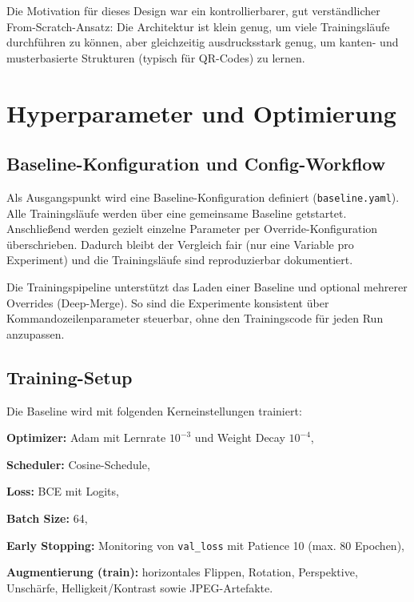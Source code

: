 Die Motivation für dieses Design war ein kontrollierbarer, gut verständlicher \glqq From-Scratch\grqq{}-Ansatz: Die Architektur ist klein genug, um viele Trainingsläufe durchführen zu können, aber gleichzeitig ausdrucksstark genug, um kanten- und musterbasierte Strukturen (typisch für \ac{QR}-Codes) zu lernen.

\section{Hyperparameter und Optimierung}
\label{sec:cnn_hyperparameter}

\subsection{Baseline-Konfiguration und Config-Workflow}
\label{subsec:cnn_baseline_config}

Als Ausgangspunkt wird eine Baseline-Konfiguration definiert (\texttt{baseline.yaml}). Alle Trainingsläufe werden über eine gemeinsame Baseline getstartet. Anschließend werden gezielt einzelne Parameter per Override-Konfiguration überschrieben. Dadurch bleibt der Vergleich fair (nur eine Variable pro Experiment) und die Trainingsläufe sind reproduzierbar dokumentiert.

Die Trainingspipeline unterstützt das Laden einer Baseline und optional mehrerer Overrides (Deep-Merge). So sind die Experimente konsistent über Kommandozeilenparameter steuerbar, ohne den Trainingscode für jeden Run anzupassen.

\subsection{Training-Setup}
\label{subsec:cnn_training_setup}

Die Baseline wird mit folgenden Kerneinstellungen trainiert:
\begin{listNorm}
    \item \textbf{Optimizer:} Adam mit Lernrate $10^{-3}$ und Weight Decay $10^{-4}$,
    \item \textbf{Scheduler:} Cosine-Schedule,
    \item \textbf{Loss:} \ac{BCE} mit Logits,
    \item \textbf{Batch Size:} 64,
    \item \textbf{Early Stopping:} Monitoring von \texttt{val\_loss} mit Patience 10 (max. 80 Epochen),
    \item \textbf{Augmentierung (train):} horizontales Flippen, Rotation, Perspektive, Unschärfe, Helligkeit/Kontrast sowie JPEG-Artefakte.
\end{listNorm}

